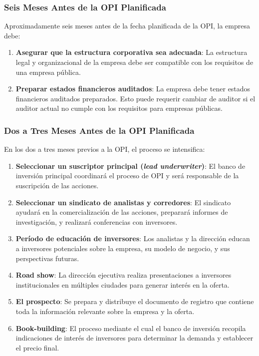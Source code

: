 \subsubsection{Seis Meses Antes de la OPI Planificada}

Aproximadamente seis meses antes de la fecha planificada de la OPI, la empresa debe:

\begin{enumerate}
\item \textbf{Asegurar que la estructura corporativa sea adecuada}: La estructura legal y organizacional de la empresa debe ser compatible con los requisitos de una empresa pública.
\item \textbf{Preparar estados financieros auditados}: La empresa debe tener estados financieros auditados preparados. Esto puede requerir cambiar de auditor si el auditor actual no cumple con los requisitos para empresas públicas.
\end{enumerate}

\subsubsection{Dos a Tres Meses Antes de la OPI Planificada}

En los dos a tres meses previos a la OPI, el proceso se intensifica:

\begin{enumerate}
\item \textbf{Seleccionar un suscriptor principal (\textit{lead underwriter})}: El banco de inversión principal coordinará el proceso de OPI y será responsable de la suscripción de las acciones.
\item \textbf{Seleccionar un sindicato de analistas y corredores}: El sindicato ayudará en la comercialización de las acciones, preparará informes de investigación, y realizará conferencias con inversores.
\item \textbf{Período de educación de inversores}: Los analistas y la dirección educan a inversores potenciales sobre la empresa, su modelo de negocio, y sus perspectivas futuras.
\item \textbf{Road show}: La dirección ejecutiva realiza presentaciones a inversores institucionales en múltiples ciudades para generar interés en la oferta.
\item \textbf{El prospecto}: Se prepara y distribuye el documento de registro que contiene toda la información relevante sobre la empresa y la oferta.
\item \textbf{Book-building}: El proceso mediante el cual el banco de inversión recopila indicaciones de interés de inversores para determinar la demanda y establecer el precio final.
\end{enumerate}

